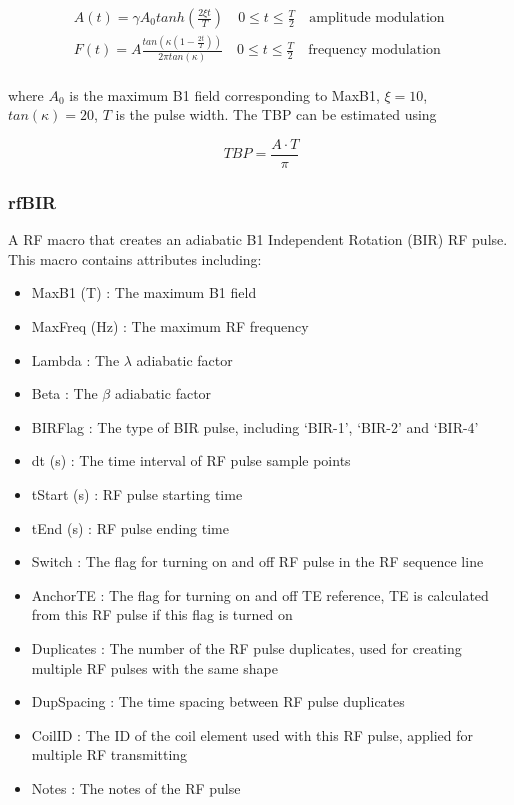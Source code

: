 \documentclass{book}%
\begin{document}
\begin{equation}\
\begin{aligned}
A(t) = \gamma A_0 tanh(\frac{2 \xi t}{T}) \quad 0 \leq t \leq \frac{T}{2} \quad \text{amplitude modulation } \\
F(t) = A \frac{tan(\kappa (1-\frac{2t}{T}))}{2 \pi tan(\kappa)} \quad 0 \leq t \leq \frac{T}{2} \quad \text{frequency modulation } \\
\end{aligned}
\label{eq:TanhTan}
\end{equation}

where $A_0$ is the maximum B1 field corresponding to MaxB1, $\xi = 10$, $tan(\kappa) = 20$, $T$ is the pulse width. The TBP can be estimated using

\begin{equation}\
TBP = \frac{A\cdot T}{\pi}
\label{eq:TBPTanhTan}
\end{equation}


\subsubsection{rfBIR}

A RF macro that creates an adiabatic B1 Independent Rotation (BIR) RF pulse. This macro contains attributes including:

\begin{itemize}
	\item MaxB1 (T) : The maximum B1 field
	\item MaxFreq (Hz) : The maximum RF frequency
	\item Lambda : The $\lambda$ adiabatic factor
	\item Beta : The $\beta$ adiabatic factor
	\item BIRFlag : The type of BIR pulse, including `BIR-1', `BIR-2' and `BIR-4'
	\item dt (s) : The time interval of RF pulse sample points
	\item tStart (s) : RF pulse starting time
	\item tEnd (s) : RF pulse ending time
	\item Switch : The flag for turning on and off RF pulse in the RF sequence line
	\item AnchorTE : The flag for turning on and off TE reference, TE is calculated from this RF pulse if this flag is turned on
	\item Duplicates : The number of the RF pulse duplicates, used for creating multiple RF pulses with the same shape
	\item DupSpacing : The time spacing between RF pulse duplicates
	\item CoilID : The ID of the coil element used with this RF pulse, applied for multiple RF transmitting
	\item Notes : The notes of the RF pulse 
\end{itemize}
\end{document}
